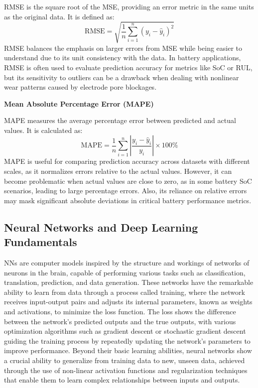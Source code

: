 RMSE is the square root of the MSE, providing an error metric in the same units as the original data. It is defined as:
\begin{equation}
\text{RMSE} = \sqrt{\frac{1}{n} \sum_{i=1}^{n} (y_i - \hat{y}_i)^2}
\end{equation}
RMSE balances the emphasis on larger errors from MSE while being easier to understand due to its unit consistency with the data. In battery applications, RMSE is often used to evaluate prediction accuracy for metrics like SoC or RUL, but its sensitivity to outliers can be a drawback when dealing with nonlinear wear patterns caused by electrode pore blockages.

\vspace{1cm}
\textbf{Mean Absolute Percentage Error (MAPE)}

MAPE measures the average percentage error between predicted and actual values. It is calculated as:
\begin{equation}
\text{MAPE} = \frac{1}{n} \sum_{i=1}^{n} \left| \frac{y_i - \hat{y}_i}{y_i} \right| \times 100\%
\end{equation}
MAPE is useful for comparing prediction accuracy across datasets with different scales, as it normalizes errors relative to the actual values. However, it can become problematic when actual values are close to zero, as in some battery SoC scenarios, leading to large percentage errors. Also, its reliance on relative errors may mask significant absolute deviations in critical battery performance metrics.

\vspace{1cm}
\subsection{Neural Networks and Deep Learning Fundamentals}

NNs are computer models inspired by the structure and workings of networks of neurons in the brain, capable of performing various tasks such as classification, translation, prediction, and data generation. These networks have the remarkable ability to learn from data through a process called training, where the network receives input-output pairs and adjusts its internal parameters, known as weights and activations, to minimize the loss function. The loss shows the difference between the network's predicted outputs and the true outputs, with various optimization algorithms such as gradient descent or stochastic gradient descent guiding the training process by repeatedly updating the network's parameters to improve performance. Beyond their basic learning abilities, neural networks show a crucial ability to generalize from training data to new, unseen data, achieved through the use of non-linear activation functions and regularization techniques that enable them to learn complex relationships between inputs and outputs.

